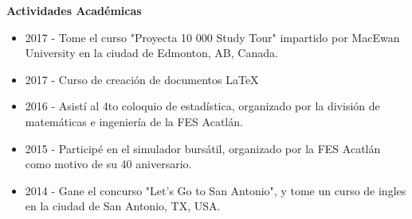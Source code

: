 \documentclass[11pt,letter]{article}
\begin{document}
\textbf{Actividades Académicas}
\begin{itemize}
\item 2017 - Tome el curso "Proyecta 10 000 Study Tour" impartido por MacEwan University en la ciudad de Edmonton, AB, Canada.
\item 2017 - Curso de creación de documentos LaTeX
\item 2016 - Asistí al 4to coloquio de estadística, organizado por la división de matemáticas e ingeniería de la FES Acatlán.
\item 2015 - Participé en el simulador bursátil, organizado por la FES Acatlán como motivo de su 40 aniversario.
\item 2014 - Gane el concurso "Let's Go to San Antonio", y tome un curso de ingles en la ciudad de San Antonio, TX, USA. 
\end{itemize}
\end{document}
